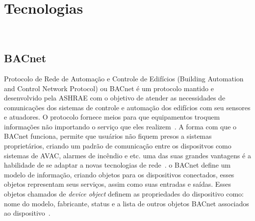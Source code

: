 \section{Tecnologias}
~\label{tecnologias}

\subsection{BACnet}
Protocolo de Rede de Automação e Controle de Edifícios (Building Automation and Control Network Protocol) ou BACnet é um protocolo 
mantido e desenvolvido pela ASHRAE com o objetivo de atender as necessidades de comunicações dos sistemas de controle e automação 
dos edifícios com seu sensores e atuadores. O protocolo fornece meios para que equipamentos troquem informações não importando o 
serviço que eles realizem~\cite{ASHRAE135}. A forma com que o BACnet funciona, permite que usuários não fiquem presos a sistemas 
proprietários, criando um padrão de comunicação entre os dispositvos como sistemas de AVAC, alarmes de incêndio e etc. uma das suas 
grandes vantagens é a habilidade de se adaptar a novas tecnologias de rede~\cite{Bushby2002}.
o BACnet define um modelo de informação, criando objetos para os dispositivos conectados, esses objetos representam seus serviços, 
assim como suas entradas e saídas. Esses objetos chamados de \emph{device object} definem as propriedades do dispositivo como: nome do modelo,
fabricante, status e a lista de outros objetos BACnet associados ao dispositivo~\cite{Domingues2016}.


